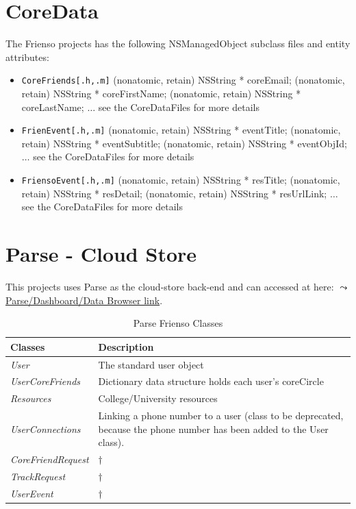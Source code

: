 \section{CoreData}
The Frienso projects has the following NSManagedObject subclass files and entity 
attributes:
\begin{itemize}
\item \texttt{CoreFriends[.h,.m]}
	\subitem \small{\@property (nonatomic, retain) NSString * coreEmail;}
	\subitem \small{\@property (nonatomic, retain) NSString * coreFirstName;}
	\subitem \small{\@property (nonatomic, retain) NSString * coreLastName;}
	\subitem \small{$\ldots$ see the CoreDataFiles for more details}
\item \texttt{FrienEvent[.h,.m]}
	\subitem \small{\@property (nonatomic, retain) NSString * eventTitle;}
	\subitem \small{\@property (nonatomic, retain) NSString * eventSubtitle;}
	\subitem \small{\@property (nonatomic, retain) NSString * eventObjId;}
	\subitem \small{$\ldots$ see the CoreDataFiles for more details}
\item \texttt{FriensoEvent[.h,.m]}
	\subitem \small{\@property (nonatomic, retain) NSString * resTitle;}
	\subitem \small{\@property (nonatomic, retain) NSString * resDetail;}
	\subitem \small{\@property (nonatomic, retain) NSString * resUrlLink;}
	\subitem \small{$\ldots$ see the CoreDataFiles for more details}
\end{itemize}\normalsize

\section{Parse - Cloud Store}
This projects uses Parse as the cloud-store back-end and can accessed at here: 
\href{https://www.parse.com/apps/frienso--2/collections}{$\leadsto$ Parse/Dashboard/Data Browser 
link}.

\begin{table}[ht!]%
	\caption{Parse Frienso Classes \label{tab:table_label}}
	\begin{tabularx}{\linewidth}{ l X }
	\textbf{Classes} & \textbf{Description} \\\hline
	\emph{User}  & The standard user object \\
	\emph{UserCoreFriends}  & Dictionary data structure holds each user's coreCircle \\
	\emph{Resources}        & College/University resources \\
	\emph{UserConnections}	& Linking a phone number to a user (class to be deprecated,
	because the phone number has been added to the User class).\\
	\emph{CoreFriendRequest}& $\dagger$\\
	\emph{TrackRequest} 	& $\dagger$\\
	\emph{UserEvent} 		& $\dagger$\\
	\end{tabularx}\end{table}%

